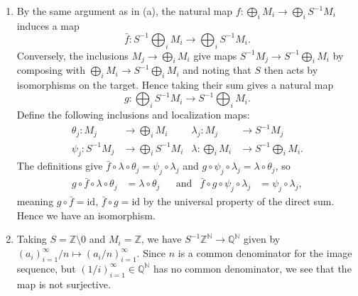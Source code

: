 \documentclass{report}
\newcommand{\induced}[1]{\bar{#1}} %
\newcommand{\id}{{\mathrm{id}}} %
\newcommand{\N}{\mathbb{N}}
\newcommand{\Z}{\mathbb{Z}}
\newcommand{\Q}{\mathbb{Q}}
\begin{document}
\begin{enumerate}[label=\textbf{1.3.\Alph*.}]
\begin{enumerate}[label=(\alph*)]
		      \item By the same argument as in (a), the natural map
		            $f:\bigoplus_iM_i\to\bigoplus_iS^{-1}M_i$ induces a map
		            \begin{equation*}
			            \induced{f}:S^{-1}\bigoplus_iM_i
			            \to\bigoplus_iS^{-1}M_i.
		            \end{equation*}
		            Conversely, the inclusions $M_j\to\bigoplus_iM_i$ give maps
		            $S^{-1}M_j\to S^{-1}\bigoplus_iM_i$ by
		            composing with $\bigoplus_iM_i\to S^{-1}\bigoplus_iM_i$
		            and noting that $S$ then acts by isomorphisms on the target.
		            Hence taking their sum gives a natural map
		            \begin{equation*}
			            g:\bigoplus_iS^{-1}M_i
			            \to S^{-1}\bigoplus_iM_i.
		            \end{equation*}
		            Define the following inclusions and localization maps:
		            \begin{align*}
			            \theta_j:M_j           & \to\bigoplus_iM_i         &
			            \lambda_j:M_j          & \to S^{-1}M_j               \\
			            \psi_j:S^{-1}M_j       & \to\bigoplus_iS^{-1}M_i   &
			            \lambda:\bigoplus_iM_i & \to S^{-1}\bigoplus_iM_i.
		            \end{align*}
		            The definitions give
		            $\induced{f}\circ\lambda\circ\theta_j=\psi_j\circ\lambda_j$
		            and $g\circ\psi_j\circ\lambda_j=\lambda\circ\theta_j$, so
		            \begin{align*}
			            g\circ\induced{f}\circ\lambda\circ\theta_j
			             & = \lambda\circ\theta_j  &  & \text{and} &
			            \induced{f}\circ g\circ\psi_j\circ\lambda_j
			             & = \psi_j\circ\lambda_j,
		            \end{align*}
		            meaning $g\circ\induced{f}=\id$, $\induced{f}\circ g=\id$
		            by the universal property of the direct sum. Hence we have
		            an isomorphism.

		      \item Taking $S=\Z\setminus0$ and $M_i=\Z$, we have
		            $S^{-1}\Z^\N\to\Q^\N$ given by
		            $(a_i)_{i=1}^\infty/n\mapsto(a_i/n)_{i=1}^\infty$.
		            Since $n$ is a common denominator for the image sequence, but
		            $(1/i)_{i=1}^\infty\in\Q^\N$ has no common denominator,
		            we see that the map is not surjective.
	      \end{enumerate}


\end{enumerate}
\end{document}
